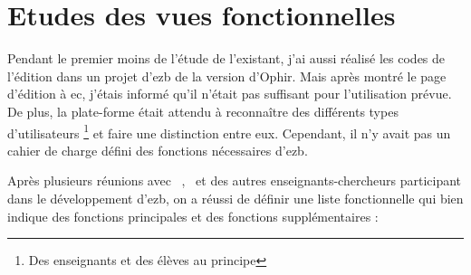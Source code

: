 \section{Etudes des vues fonctionnelles}

Pendant le premier moins de l’étude de l’existant, j’ai aussi réalisé les codes de l’édition dans un projet d’ezb de la version d’Ophir. Mais après montré le page d’édition à ec, j’étais informé qu’il n’était pas suffisant pour l’utilisation prévue. De plus, la plate-forme était attendu à reconnaître des différents types d’utilisateurs \footnote{Des enseignants et des élèves au principe} et  faire une distinction entre eux. Cependant, il n’y avait pas un cahier de charge défini des fonctions nécessaires d’ezb. 

Après plusieurs réunions avec \ec\ , \tls\ et des autres enseignants-chercheurs participant dans le développement d’ezb, on a réussi de définir une liste fonctionnelle qui bien indique des fonctions principales et des fonctions supplémentaires :


